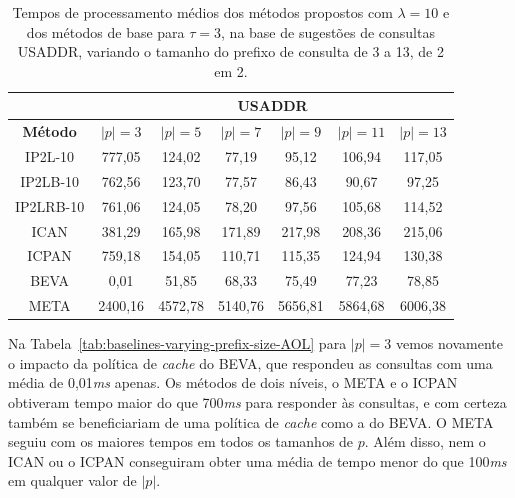\begin{table}[h]
\centering
\begin{tabular}{c|c|c|c|c|c|c|}
\cline{2-7}
\multicolumn{1}{l|}{} & \multicolumn{6}{c|}{\textbf{USADDR}} \\ \hline
\multicolumn{1}{|c|}{\textbf{Método}} & $|p| =  3$ & $|p| =  5$ & $|p| =  7$ & $|p| =  9$ & $|p| =  11$ & $|p| =  13$ \\ \hline
\multicolumn{1}{|c|}{IP2L-10} & 777,05 & 124,02 & 77,19 & 95,12 & 106,94 & 117,05 \\ \hline
\multicolumn{1}{|c|}{IP2LB-10} & 762,56 & 123,70 & 77,57 & 86,43 & 90,67 & 97,25 \\ \hline
\multicolumn{1}{|c|}{IP2LRB-10} & 761,06 & 124,05 & 78,20 & 97,56 & 105,68 & 114,52 \\ \hline
\multicolumn{1}{|c|}{ICAN} & 381,29 & 165,98 & 171,89 & 217,98 & 208,36 & 215,06 \\ \hline
\multicolumn{1}{|c|}{ICPAN} & 759,18 & 154,05 & 110,71 & 115,35 & 124,94 & 130,38 \\ \hline
\multicolumn{1}{|c|}{BEVA} & 0,01 & 51,85 & 68,33 & 75,49 & 77,23 & 78,85 \\ \hline
\multicolumn{1}{|c|}{META} & 2400,16 & 4572,78 & 5140,76 & 5656,81 & 5864,68 & 6006,38 \\ \hline
\end{tabular}
\caption{Tempos de processamento médios dos métodos propostos com $\lambda=10$ e dos métodos de base para $\tau=3$, na base de sugestões de consultas USADDR, variando o tamanho do prefixo de consulta de 3 a 13, de 2 em 2.}
\label{tab:baselines-varying-prefix-size-USADDR}
\end{table}

Na Tabela~\ref{tab:baselines-varying-prefix-size-AOL} para $|p|=3$ vemos novamente o impacto da política de \textit{cache} do BEVA, que respondeu as consultas com uma média de 0,01\textit{ms} apenas. Os métodos de dois níveis, o META e o ICPAN obtiveram tempo maior do que 700\textit{ms} para responder às consultas, e com certeza também se beneficiariam de uma política de \textit{cache} como a do BEVA. O META seguiu com os maiores tempos em todos os tamanhos de $p$. Além disso, nem o ICAN ou o ICPAN conseguiram obter uma média de tempo menor do que 100\textit{ms} em qualquer valor de $|p|$. 

